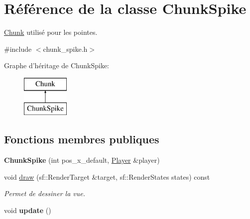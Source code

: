 \hypertarget{class_chunk_spike}{\section{Référence de la classe Chunk\+Spike}
\label{class_chunk_spike}
}


\hyperlink{class_chunk}{Chunk} utilisé pour les pointes.  




{\ttfamily \#include $<$chunk\+\_\+spike.\+h$>$}

Graphe d'héritage de Chunk\+Spike\+:\begin{figure}[H]
\begin{center}
\leavevmode
\includegraphics[height=2.000000cm]{class_chunk_spike}
\end{center}
\end{figure}
\subsection*{Fonctions membres publiques}
\begin{DoxyCompactItemize}
\item 
\hypertarget{class_chunk_spike_af2a47676aa18b4acec37c8b6eb44d8f0}{{\bfseries Chunk\+Spike} (int pos\+\_\+x\+\_\+default, \hyperlink{class_player}{Player} \&player)}\label{class_chunk_spike_af2a47676aa18b4acec37c8b6eb44d8f0}

\item 
\hypertarget{class_chunk_spike_a62f28c1095c3724271d15060db122942}{void \hyperlink{class_chunk_spike_a62f28c1095c3724271d15060db122942}{draw} (sf\+::\+Render\+Target \&target, sf\+::\+Render\+States states) const }\label{class_chunk_spike_a62f28c1095c3724271d15060db122942}

\begin{DoxyCompactList}\small\item\em Permet de dessiner la vue. \end{DoxyCompactList}\item 
\hypertarget{class_chunk_spike_a4bcc259543827b62d8031f5a3dd32433}{void {\bfseries update} ()}\label{class_chunk_spike_a4bcc259543827b62d8031f5a3dd32433}

\end{DoxyCompactItemize}
